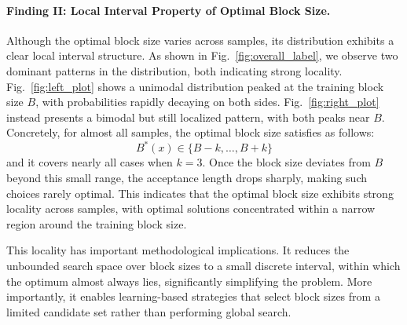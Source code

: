 \documentclass{llmxive}
\begin{document}
\paragraph{Finding II: Local Interval Property of Optimal Block Size.}
Although the optimal block size varies across samples, its distribution exhibits a clear local interval structure. As shown in Fig.~\ref{fig:overall_label}, we observe two dominant patterns in the distribution, both indicating strong locality. Fig.~\ref{fig:left_plot} shows a unimodal distribution peaked at the training block size $B$, with probabilities rapidly decaying on both sides. Fig.~\ref{fig:right_plot} instead presents a bimodal but still localized pattern, with both peaks near $B$. Concretely, for almost all samples, the optimal block size satisfies as follows:
\begin{equation}
B^*(x) \in \{B-k, \ldots, B+k\}
\end{equation}
and it covers nearly all cases when $k=3$. Once the block size deviates from $B$ beyond this small range, the acceptance length drops sharply, making such choices rarely optimal. This indicates that the optimal block size exhibits strong locality across samples, with optimal solutions concentrated within a narrow region around the training block size.

This locality has important methodological implications. It reduces the unbounded search space over block sizes to a small discrete interval, within which the optimum almost always lies, significantly simplifying the problem. More importantly, it enables learning-based strategies that select block sizes from a limited candidate set rather than performing global search.
\end{document}
